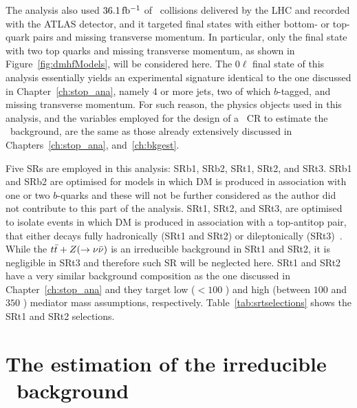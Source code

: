 		The analysis also used $36.1\, \mbox{fb$^{-1}$}$ of \pp\ collisions delivered by the \ac{LHC} and recorded with the \ac{ATLAS} detector, and it targeted final states with either bottom- or top-quark pairs and missing transverse momentum. In particular, only the final state with two top quarks and missing transverse momentum, as shown in Figure~\ref{fig:dmhfModels}, will be considered here. The $0\ell$ final state of this analysis essentially yields an experimental signature identical to the one discussed in Chapter~\ref{ch:stop_ana}, namely 4 or more jets, two of which $b$-tagged, and missing transverse momentum. For such reason, the physics objects used in this analysis, and the variables employed for the design of a \ttgamma\ \ac{CR} to estimate the \ttZ\ background, are the same as those already extensively discussed in Chapters~\ref{ch:stop_ana}, and~\ref{ch:bkgest}. 

		Five \acp{SR} are employed in this analysis: SRb1, SRb2, SRt1, SRt2, and SRt3. SRb1 and SRb2 are optimised for models in which \ac{DM} is produced in association with one or two $b$-quarks and these will not be further considered as the author did not contribute to this part of the analysis. SRt1, SRt2, and SRt3, are optimised to isolate events in which \ac{DM} is produced in association with a top-antitop pair, that either decays fully hadronically (SRt1 and SRt2) or dileptonically (SRt3)~\cite{DMhf}. While the $t\bar{t}+Z(\rightarrow \nu\bar{\nu})$ is an irreducible background in SRt1 and SRt2, it is negligible in SRt3 and therefore such \ac{SR} will be neglected here. SRt1 and SRt2 have a very similar background composition as the one discussed in Chapter~\ref{ch:stop_ana} and they target low ($< 100$ \GeV) and high (between $100$ and $350$ \GeV) mediator mass assumptions, respectively. 
		Table~\ref{tab:srtselections} shows the SRt1 and SRt2 selections.%


	\section{The estimation of the irreducible \ttZ\ background}

